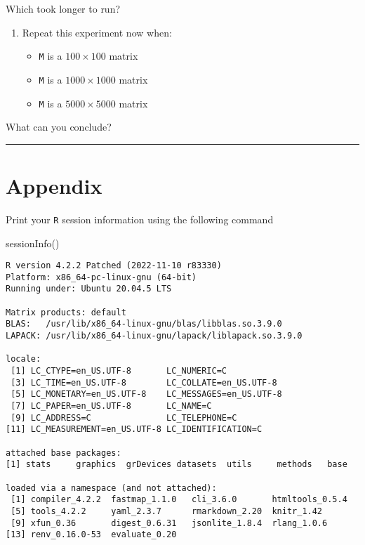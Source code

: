 \documentclass[
  letterpaper,
  DIV=11,
  numbers=noendperiod]{scrartcl}
\newenvironment{Shaded}{\begin{snugshade}}{\end{snugshade}}
\newcommand{\FunctionTok}[1]{\textcolor[rgb]{0.28,0.35,0.67}{#1}}
\newcommand{\NormalTok}[1]{\textcolor[rgb]{0.00,0.23,0.31}{#1}}
\providecommand{\tightlist}{%
  \setlength{\itemsep}{0pt}\setlength{\parskip}{0pt}}\usepackage{longtable,booktabs,array}
\begin{document}
Which took longer to run?

\begin{enumerate}
\def\labelenumi{\arabic{enumi}.}
\setcounter{enumi}{5}
\tightlist
\item
  Repeat this experiment now when:

  \begin{itemize}
  \tightlist
  \item
    \texttt{M} is a \(100 \times 100\) matrix
  \item
    \texttt{M} is a \(1000 \times 1000\) matrix
  \item
    \texttt{M} is a \(5000 \times 5000\) matrix
  \end{itemize}
\end{enumerate}

What can you conclude?

\begin{center}\rule{0.5\linewidth}{0.5pt}\end{center}

\hypertarget{appendix}{%
\section{Appendix}\label{appendix}}

Print your \texttt{R} session information using the following command

\begin{Shaded}
\begin{Highlighting}[]
\FunctionTok{sessionInfo}\NormalTok{()}
\end{Highlighting}
\end{Shaded}

\begin{verbatim}
R version 4.2.2 Patched (2022-11-10 r83330)
Platform: x86_64-pc-linux-gnu (64-bit)
Running under: Ubuntu 20.04.5 LTS

Matrix products: default
BLAS:   /usr/lib/x86_64-linux-gnu/blas/libblas.so.3.9.0
LAPACK: /usr/lib/x86_64-linux-gnu/lapack/liblapack.so.3.9.0

locale:
 [1] LC_CTYPE=en_US.UTF-8       LC_NUMERIC=C              
 [3] LC_TIME=en_US.UTF-8        LC_COLLATE=en_US.UTF-8    
 [5] LC_MONETARY=en_US.UTF-8    LC_MESSAGES=en_US.UTF-8   
 [7] LC_PAPER=en_US.UTF-8       LC_NAME=C                 
 [9] LC_ADDRESS=C               LC_TELEPHONE=C            
[11] LC_MEASUREMENT=en_US.UTF-8 LC_IDENTIFICATION=C       

attached base packages:
[1] stats     graphics  grDevices datasets  utils     methods   base     

loaded via a namespace (and not attached):
 [1] compiler_4.2.2  fastmap_1.1.0   cli_3.6.0       htmltools_0.5.4
 [5] tools_4.2.2     yaml_2.3.7      rmarkdown_2.20  knitr_1.42     
 [9] xfun_0.36       digest_0.6.31   jsonlite_1.8.4  rlang_1.0.6    
[13] renv_0.16.0-53  evaluate_0.20  
\end{verbatim}
\end{document}
